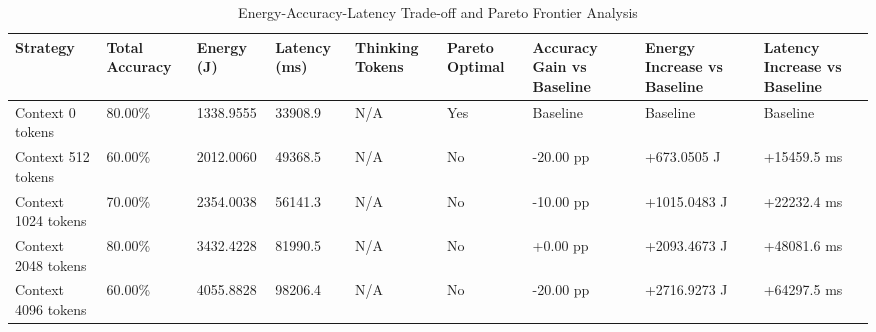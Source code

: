 \begin{table}
\caption{Energy-Accuracy-Latency Trade-off and Pareto Frontier Analysis}
\label{tab:tradeoff_comparison}
\begin{tabular}{lllllllll}
\toprule
Strategy & Total Accuracy & Energy (J) & Latency (ms) & Thinking Tokens & Pareto Optimal & Accuracy Gain vs Baseline & Energy Increase vs Baseline & Latency Increase vs Baseline \\
\midrule
Context 0 tokens & 80.00\% & 1338.9555 & 33908.9 & N/A & Yes & Baseline & Baseline & Baseline \\
Context 512 tokens & 60.00\% & 2012.0060 & 49368.5 & N/A & No & -20.00 pp & +673.0505 J & +15459.5 ms \\
Context 1024 tokens & 70.00\% & 2354.0038 & 56141.3 & N/A & No & -10.00 pp & +1015.0483 J & +22232.4 ms \\
Context 2048 tokens & 80.00\% & 3432.4228 & 81990.5 & N/A & No & +0.00 pp & +2093.4673 J & +48081.6 ms \\
Context 4096 tokens & 60.00\% & 4055.8828 & 98206.4 & N/A & No & -20.00 pp & +2716.9273 J & +64297.5 ms \\
\bottomrule
\end{tabular}
\end{table}
